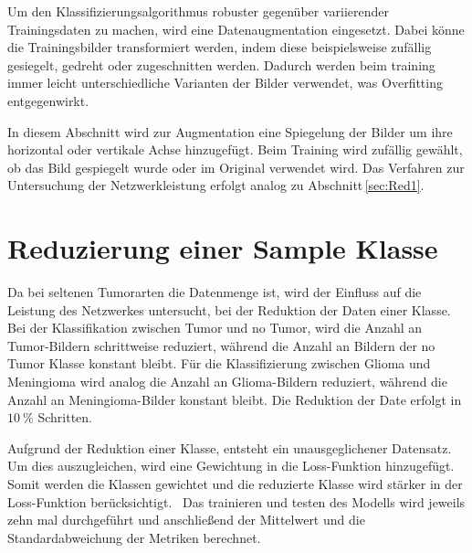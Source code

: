 Um den Klassifizierungsalgorithmus robuster gegenüber variierender Trainingsdaten zu machen, wird eine Datenaugmentation eingesetzt.
Dabei könne die Trainingsbilder transformiert werden, indem diese beispielsweise zufällig gesiegelt, gedreht oder zugeschnitten werden. 
Dadurch werden beim training immer leicht unterschiedliche Varianten der Bilder verwendet, was Overfitting entgegenwirkt.~\cite{Yamashita2018}

In diesem Abschnitt wird zur Augmentation eine Spiegelung der Bilder um ihre horizontal oder vertikale Achse hinzugefügt.
Beim Training wird zufällig gewählt, ob das Bild gespiegelt wurde oder im Original verwendet wird.
Das Verfahren zur Untersuchung der Netzwerkleistung erfolgt analog zu Abschnitt \ref{sec:Red1}.    

\section{Reduzierung einer Sample Klasse}

Da bei seltenen Tumorarten die Datenmenge ist, wird der Einfluss auf die Leistung des Netzwerkes untersucht, 
bei der Reduktion der Daten einer Klasse.
Bei der Klassifikation zwischen Tumor und no Tumor, wird die Anzahl an Tumor-Bildern schrittweise reduziert, 
während die Anzahl an Bildern der no Tumor Klasse konstant bleibt.
Für die Klassifizierung zwischen Glioma und Meningioma wird analog die Anzahl an Glioma-Bildern reduziert, während die Anzahl an Meningioma-Bilder konstant bleibt.
Die Reduktion der Date erfolgt in $\qty{10}{\%}$ Schritten. 

Aufgrund der Reduktion einer Klasse, entsteht ein unausgeglichener Datensatz.
Um dies auszugleichen, wird eine Gewichtung in die Loss-Funktion hinzugefügt.
Somit werden die Klassen gewichtet und die reduzierte Klasse wird stärker in der Loss-Funktion berücksichtigt.~\cite{pytorchCrossEntropy}
Das trainieren und testen des Modells wird jeweils zehn mal durchgeführt und anschließend der Mittelwert und die Standardabweichung der
Metriken berechnet.
